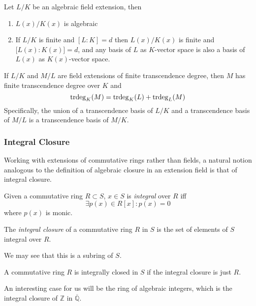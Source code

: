 \begin{lemma}
   Let \(L/K\) be an algebraic field extension, then
   \begin{enumerate}[label=\roman*, align=Center]
      \item \(L(x)/K(x)\) is algebraic
      \item If \(L/K\) is finite and \([L:K] = d\) then \(L(x)/K(x)\) is finite and \(\big[L(x):K(x)\big] = d\), and any basis of \(L\) as \(K\)-vector space is also a basis of \(L(x)\) as \(K(x)\)-vector space.
   \end{enumerate}
\end{lemma}

\begin{proposition}
   If \(L/K\) and \(M/L\) are field extensions of finite transcendence degree, then \(M\) has finite transcendence degree over \(K\) and
   \[\operatorname{trdeg}_K(M) = \operatorname{trdeg}_K(L) + \operatorname{trdeg}_L(M)\]
   Specifically, the union of a transcendence basis of \(L/K\) and a transcendence basis of \(M/L\) is a transcendence basis of \(M/K\).
\end{proposition}

\subsubsection{Integral Closure}
Working with extensions of commutative rings rather than fields, a natural notion analogous to the definition of algebraic closure in an extension field is that of integral closure.
\begin{definition}
   Given a commutative ring \(R \subset S\), \(x \in S\) is \emph{integral} over \(R\) iff
   \[\exists p(x) \in R[x]: p(x) = 0\]
   where \(p(x)\) is monic.
\end{definition}

\begin{definition}
   The \emph{integral closure} of a commutative ring \(R\) in \(S\) is the set of elements of \(S\) integral over \(R\).
\end{definition}
\begin{remark}
   We may see that this is a subring of \(S\).
\end{remark}

\begin{definition}
   A commutative ring \(R\) is integrally closed in \(S\) if the integral closure is just \(R\).
\end{definition}
An interesting case for us will be the ring of algebraic integers, which is the integral closure of \(\mathbb{Z}\) in \(\overline{\mathbb{Q}}\).


